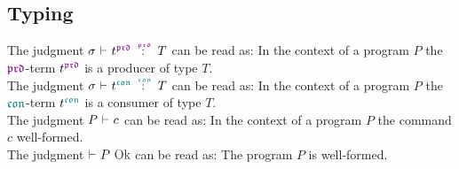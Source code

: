 \begin{prooftree}
\end{prooftree}
\vspace*{0.3cm}

\begin{prooftree}
\end{prooftree}
\vspace*{0.3cm}

\subsection{Typing}

The judgment $\typetmprd{\sigma}{t^{\polprd}}{T}$ can be read as: In the context of a program $P$ the $\polprd$-term $t^{\polprd}$ is a producer of type $T$.
\\
The judgment $\typetmcon{\sigma}{t^{\polcon}}{T}$ can be read as: In the context of a program $P$ the $\polcon$-term $t^{\polcon}$ is a consumer of type $T$.
\\
The judgment $\typecmd{P}{c}$ can be read as: In the context of a program $P$ the command $c$ well-formed.
\\
The judgment $\typewf{P}$ can be read as: The program $P$ is well-formed.

\begin{prooftree}
\end{prooftree}
\vspace*{0.3cm}


